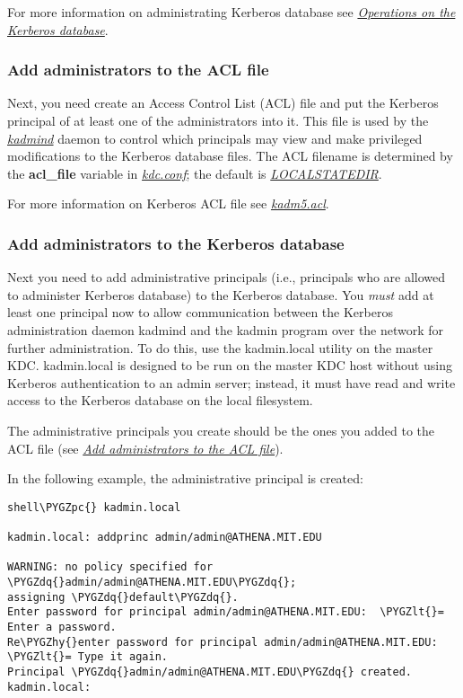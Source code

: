 \documentclass[letterpaper,10pt,english]{sphinxmanual}
\def\PYGZlt{\char`\<}
\def\PYGZpc{\char`\%}
\def\PYGZhy{\char`\-}
\def\PYGZdq{\char`\"}
\begin{document}
For more information on administrating Kerberos database see
{\hyperref[admin/database:db-operations]{\emph{Operations on the Kerberos database}}}.


\subsubsection{Add administrators to the ACL file}
\label{admin/install_kdc:add-administrators-to-the-acl-file}\label{admin/install_kdc:admin-acl}
Next, you need create an Access Control List (ACL) file and put the
Kerberos principal of at least one of the administrators into it.
This file is used by the {\hyperref[admin/admin_commands/kadmind:kadmind-8]{\emph{kadmind}}} daemon to control which
principals may view and make privileged modifications to the Kerberos
database files.  The ACL filename is determined by the \textbf{acl\_file}
variable in {\hyperref[admin/conf_files/kdc_conf:kdc-conf-5]{\emph{kdc.conf}}}; the default is {\hyperref[mitK5defaults:paths]{\emph{LOCALSTATEDIR}}}.

For more information on Kerberos ACL file see {\hyperref[admin/conf_files/kadm5_acl:kadm5-acl-5]{\emph{kadm5.acl}}}.


\subsubsection{Add administrators to the Kerberos database}
\label{admin/install_kdc:add-administrators-to-the-kerberos-database}\label{admin/install_kdc:addadmin-kdb}
Next you need to add administrative principals (i.e., principals who
are allowed to administer Kerberos database) to the Kerberos database.
You \emph{must} add at least one principal now to allow communication
between the Kerberos administration daemon kadmind and the kadmin
program over the network for further administration.  To do this, use
the kadmin.local utility on the master KDC.  kadmin.local is designed
to be run on the master KDC host without using Kerberos authentication
to an admin server; instead, it must have read and write access to the
Kerberos database on the local filesystem.

The administrative principals you create should be the ones you added
to the ACL file (see {\hyperref[admin/install_kdc:admin-acl]{\emph{Add administrators to the ACL file}}}).

In the following example, the administrative principal 
is created:

\begin{Verbatim}[commandchars=\\\{\}]
shell\PYGZpc{} kadmin.local

kadmin.local: addprinc admin/admin@ATHENA.MIT.EDU

WARNING: no policy specified for \PYGZdq{}admin/admin@ATHENA.MIT.EDU\PYGZdq{};
assigning \PYGZdq{}default\PYGZdq{}.
Enter password for principal admin/admin@ATHENA.MIT.EDU:  \PYGZlt{}= Enter a password.
Re\PYGZhy{}enter password for principal admin/admin@ATHENA.MIT.EDU:  \PYGZlt{}= Type it again.
Principal \PYGZdq{}admin/admin@ATHENA.MIT.EDU\PYGZdq{} created.
kadmin.local:
\end{Verbatim}
\end{document}

